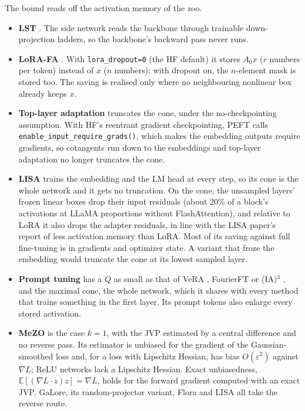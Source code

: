 \begin{explains}
The bound reads off the activation memory of the zoo.
\begin{itemize}
  \item \textbf{LST} \citep{sung2022lst}. The side network reads the backbone through trainable down-projection
  ladders, so the backbone's backward pass never runs.
  \item \textbf{LoRA-FA} \citep{zhang2023lora}. With \texttt{lora\_dropout=0} (the HF default) it stores $A_0x$ ($r$
  numbers per token) instead of $x$ ($n$ numbers); with dropout on, the $n$-element mask is stored too. The saving is
  realised only where no neighbouring nonlinear box already keeps $x$.
  \item \textbf{Top-layer adaptation} truncates the cone, under the no-checkpointing assumption. With HF's reentrant
  gradient checkpointing, PEFT calls \texttt{enable\_input\_require\_grads()}, which makes the embedding outputs require
  gradients, so cotangents run down to the embeddings and top-layer adaptation no longer truncates the cone.
  \item \textbf{LISA} \citep{pan2024lisa} trains the embedding and the LM head at every step, so its cone is the whole
  network and it gets no truncation. On the cone, the unsampled layers' frozen linear boxes drop their input residuals
  (about $20\%$ of a block's activations at LLaMA proportions without FlashAttention), and relative to LoRA it also
  drops the adapter residuals, in line with the LISA paper's report of less activation memory than LoRA. Most of its
  saving against full fine-tuning is in gradients and optimizer state. A variant that froze the embedding would
  truncate the cone at its lowest sampled layer.
  \item \textbf{Prompt tuning} \citep{lester2021power} has a $Q$ as small as that of VeRA \citep{kopiczko2023vera},
  FourierFT \citep{gao2024parameter} or (IA)$^3$ \citep{liu2022few}, and the maximal cone, the whole network, which it
  shares with every method that trains something in the first layer. Its prompt tokens also enlarge every stored
  activation.
  \item \textbf{MeZO} \citep{malladi2023fine} is the case $k=1$, with the JVP estimated by a central difference and no
  reverse pass. Its estimator is unbiased for the gradient of the Gaussian-smoothed loss and, for a loss with Lipschitz
  Hessian, has bias $O(\varepsilon^2)$ against $\nabla L$; ReLU networks lack a Lipschitz Hessian. Exact unbiasedness,
  $\mathbb E[(\nabla L\cdot z)z]=\nabla L$, holds for the forward gradient computed with an exact JVP. GaLore, its
  random-projector variant, Flora and LISA all take the reverse route.
\end{itemize}
\end{explains}

